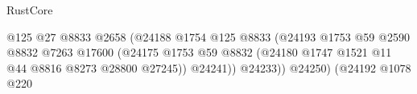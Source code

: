 \begin{lexlean}{RustCore}
\begin{coremodule}
                                                                    @125
                                                                    @27
                                                                    @8833
                                                                    @2658
                                                                    (@24188
                                                                      @1754
                                                                      @125
                                                                      @8833
                                                                      (@24193
                                                                        @1753
                                                                        @59
                                                                        @2590
                                                                        @8832
                                                                        @7263
                                                                        @17600
                                                                        (@24175
                                                                          @1753
                                                                          @59
                                                                          @8832
                                                                          (@24180
                                                                            @1747
                                                                            @1521
                                                                            @11
                                                                            @44
                                                                            @8816
                                                                            @8273
                                                                            @28800
                                                                            @27245))
                                                                        @24241))
                                                                    @24233))
                                                                @24250)
                                                              (@24192
                                                                @1078
                                                                @220

\end{coremodule}
\end{lexlean}
